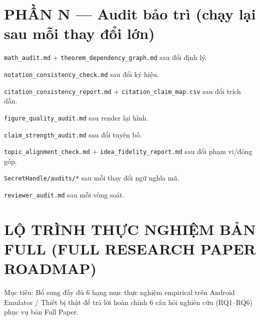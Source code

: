 \documentclass[11pt,a4paper]{article}
\newcommand{\todo}{\textcolor{shgray}{$\square$}}
\newcommand{\code}[1]{\texttt{\small #1}}
\begin{document}
\section*{PHẦN N --- Audit bảo trì (chạy lại sau mỗi thay đổi lớn)}
\begin{chk}
\item[\todo] \code{math\_audit.md} + \code{theorem\_dependency\_graph.md} sau đổi định lý.
\item[\todo] \code{notation\_consistency\_check.md} sau đổi ký hiệu.
\item[\todo] \code{citation\_consistency\_report.md} + \code{citation\_claim\_map.csv} sau đổi trích dẫn.
\item[\todo] \code{figure\_quality\_audit.md} sau render lại hình.
\item[\todo] \code{claim\_strength\_audit.md} sau đổi tuyên bố.
\item[\todo] \code{topic\_alignment\_check.md} + \code{idea\_fidelity\_report.md} sau đổi phạm vi/đóng góp.
\item[\todo] \code{SecretHandle/audits/*} sau mỗi thay đổi ngữ nghĩa mã.
\item[\todo] \code{reviewer\_audit.md} sau mỗi vòng soát.
\end{chk}

\section*{LỘ TRÌNH THỰC NGHIỆM BẢN FULL (FULL RESEARCH PAPER ROADMAP)}
{\small Mục tiêu: Bổ sung đầy đủ 6 hạng mục thực nghiệm empirical trên Android Emulator / Thiết bị thật để trả lời hoàn chỉnh 6 câu hỏi nghiên cứu (RQ1--RQ6) phục vụ bản Full Paper.}
\end{document}
